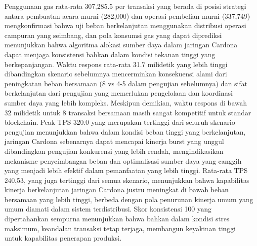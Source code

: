Penggunaan gas rata-rata 307,285.5 per transaksi yang berada di posisi strategi antara pembuatan acara murni (282,000) dan operasi pembelian murni (337,749) mengkonfirmasi bahwa uji beban berkelanjutan menggunakan distribusi operasi campuran yang seimbang, dan pola konsumsi gas yang dapat diprediksi menunjukkan bahwa algoritma alokasi sumber daya dalam jaringan Cardona dapat menjaga konsistensi bahkan dalam kondisi tekanan tinggi yang berkepanjangan. Waktu respons rata-rata 31.7 milidetik yang lebih tinggi dibandingkan skenario sebelumnya mencerminkan konsekuensi alami dari peningkatan beban bersamaan (8 vs 4-5 dalam pengujian sebelumnya) dan sifat berkelanjutan dari pengujian yang memerlukan pengelolaan dan koordinasi sumber daya yang lebih kompleks. Meskipun demikian, waktu respons di bawah 32 milidetik untuk 8 transaksi bersamaan masih sangat kompetitif untuk standar blockchain.
Peak TPS 320.0 yang merupakan tertinggi dari seluruh skenario pengujian menunjukkan bahwa dalam kondisi beban tinggi yang berkelanjutan, jaringan Cardona sebenarnya dapat mencapai kinerja burst yang unggul dibandingkan pengujian konkurensi yang lebih rendah, mengindikasikan mekanisme penyeimbangan beban dan optimalisasi sumber daya yang canggih yang menjadi lebih efektif dalam pemanfaatan yang lebih tinggi. Rata-rata TPS 240,53, yang juga tertinggi dari semua skenario, menunjukkan bahwa kapabilitas kinerja berkelanjutan jaringan Cardona justru meningkat di bawah beban bersamaan yang lebih tinggi, berbeda dengan pola penurunan kinerja umum yang umum diamati dalam sistem terdistribusi. Skor konsistensi 100 yang dipertahankan sempurna menunjukkan bahwa bahkan dalam kondisi stres maksimum, keandalan transaksi tetap terjaga, membangun keyakinan tinggi untuk kapabilitas penerapan produksi.

